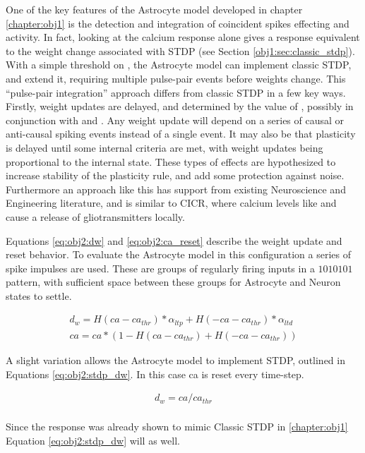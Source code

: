 One of the key features of the Astrocyte model developed in chapter
\ref{chapter:obj1} is the detection and integration of coincident spikes
effecting \ipt and \kp activity. In fact, looking at the calcium response alone
gives a response equivalent to the weight change associated with STDP (see
Section \ref{obj1:sec:classic_stdp}). With a simple threshold on \ca, the
Astrocyte model can implement classic STDP, and extend it, requiring multiple
pulse-pair events before weights change. This ``pulse-pair 
integration'' approach differs from classic STDP in a few key ways. Firstly,
weight updates are delayed, and determined by the value of \ca, possibly in
conjunction with \ipt and \kp. Any weight update will depend on a series of
causal or anti-causal spiking events instead of a single event. It may also be
that plasticity is delayed until some internal criteria are met, with weight
updates being proportional to the internal state. These types of effects are
hypothesized to increase stability of the plasticity rule, and add some
protection against noise. Furthermore an approach like this has support from
existing Neuroscience and Engineering literature, and is similar to CICR, where
calcium levels like and cause a release of gliotransmitters locally.

Equations \ref{eq:obj2:dw} and \ref{eq:obj2:ca_reset}
describe the weight update and \ca reset behavior. To evaluate the Astrocyte
model in this configuration a series of spike impulses are used. These are
groups of regularly firing inputs in a $1010101$ pattern, with sufficient space
between these groups for Astrocyte and Neuron states to settle.

\begin{align}
  d_w = H(ca - ca_{thr}) * \alpha_{ltp} + H(-ca - ca_{thr}) *
  \alpha_{ltd} \label{eq:obj2:dw} \\
  ca = ca * (1 - H(ca - ca_{thr}) +  H(-ca - ca_{thr})) \label{eq:obj2:ca_reset}
\end{align}

A slight variation allows the Astrocyte model to implement STDP, outlined in
Equations \ref{eq:obj2:stdp_dw}. In this case ca is reset every time-step.

\begin{align}
  d_w = ca / ca_{thr} \label{eq:obj2:stdp_dw} \\
\end{align}

Since the \ca response was already shown to mimic Classic STDP in \ref{chapter:obj1}
Equation \ref{eq:obj2:stdp_dw} will as well.

